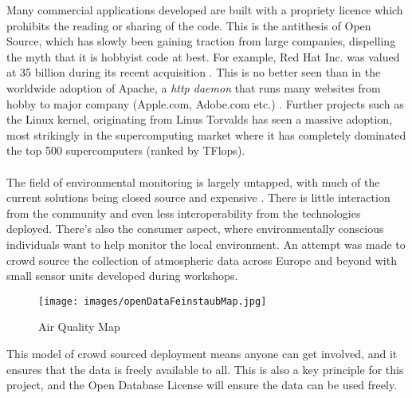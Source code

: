 Many commercial applications developed are built with a propriety licence which prohibits the reading or sharing of the code. This is the antithesis of Open Source, which has slowly been gaining traction from large companies, dispelling the myth that it is hobbyist code at best. For example, Red Hat Inc. was valued at 35 billion during its recent acquisition \citep{Hammond2018}. This is no better seen than in the worldwide adoption of Apache, a \textit{http daemon} that runs many websites from hobby to major company (Apple.com, Adobe.com etc.) \citep{W3techs2018}. Further projects such as the Linux kernel, originating from Linus Torvalds has seen a massive adoption, most strikingly in the supercomputing market where it has completely dominated the top 500 supercomputers (ranked by TFlops). \citep{Top5002018}
\\\\
The field of environmental monitoring is largely untapped, with much of the current solutions being closed source and expensive \citep{TheIoTMarketplace2015}. There is little interaction from the community and even less interoperability from the technologies deployed. There's also the consumer aspect, where environmentally conscious individuals want to help monitor the local environment. An attempt was made to crowd source the collection of atmospheric data \citep{OKLabStuttgart2015} across Europe and beyond with small sensor units developed during workshops.
\begin{figure}[H]
	\centering
	\texttt{[image: images/openDataFeinstaubMap.jpg]}
	\caption{ Air Quality Map \citep{OKLabStuttgart2018}}
	\label{fig:map}
\end{figure}
This model of crowd sourced deployment means anyone can get involved, and it ensures that the data is freely available to all. This is also a key principle for this project, and the Open Database License \citep{OpenDataCommons2011} will ensure the data can be used freely.